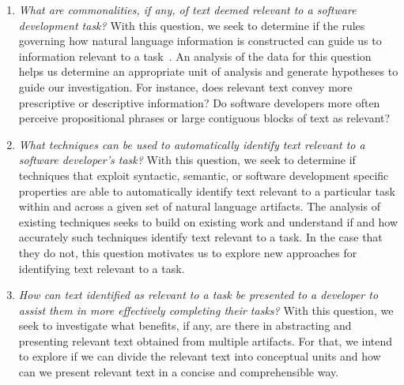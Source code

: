 \begin{enumerate}[label=\textit{RQ\arabic*},leftmargin=1.4cm]

    \item \textit{What are commonalities, if any, of text deemed relevant to a software development task?} 
        With this question, we seek to determine if the rules governing how natural language information
        is constructed can guide us to information relevant to a task~\cite{Kintsch1978a}.
        An analysis of the data for this question helps us determine an appropriate unit of analysis
        and generate hypotheses to guide our investigation.
        For instance, does relevant text convey more prescriptive or descriptive information?
        Do software developers more often perceive propositional phrases or large contiguous blocks of text as relevant?

    \item \textit{What techniques can be used to automatically identify text relevant to a software developer's task?} 
        With this question, we seek to determine if techniques that exploit syntactic, semantic, or software development specific properties are able to automatically identify text relevant to a particular task within and across a given set of natural language artifacts.
        The analysis of existing techniques seeks to build on existing work and understand if and how accurately such techniques identify
        text relevant to a task. In the case that they do not, this question motivates us to explore new approaches for identifying text relevant to a task.

    \item \textit{How can text identified as relevant to a task be presented to a developer to assist them in more effectively completing their tasks?} 
        With this question, we seek to investigate what benefits, if any, are there in abstracting and presenting relevant text obtained from multiple artifacts. For that, we intend to explore if we can divide the relevant text into conceptual units and how can we present relevant text in a concise and comprehensible way.

\end{enumerate}

\setcounter{rq}{0}



